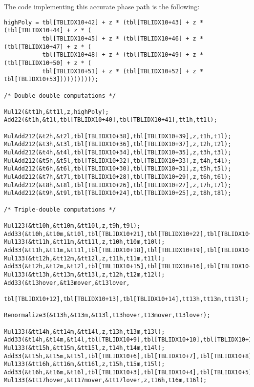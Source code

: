The code implementing this accurate phase path is the following:
\begin{lstlisting}[caption={High path accurate phase polynomial approximation},firstnumber=1]
highPoly = tbl[TBLIDX10+42] + z * (tbl[TBLIDX10+43] + z * (tbl[TBLIDX10+44] + z * (
           tbl[TBLIDX10+45] + z * (tbl[TBLIDX10+46] + z * (tbl[TBLIDX10+47] + z * (
           tbl[TBLIDX10+48] + z * (tbl[TBLIDX10+49] + z * (tbl[TBLIDX10+50] + z * (
           tbl[TBLIDX10+51] + z * (tbl[TBLIDX10+52] + z *  tbl[TBLIDX10+53]))))))))));

/* Double-double computations */

Mul12(&tt1h,&tt1l,z,highPoly);
Add22(&t1h,&t1l,tbl[TBLIDX10+40],tbl[TBLIDX10+41],tt1h,tt1l);

MulAdd212(&t2h,&t2l,tbl[TBLIDX10+38],tbl[TBLIDX10+39],z,t1h,t1l);
MulAdd212(&t3h,&t3l,tbl[TBLIDX10+36],tbl[TBLIDX10+37],z,t2h,t2l);
MulAdd212(&t4h,&t4l,tbl[TBLIDX10+34],tbl[TBLIDX10+35],z,t3h,t3l);
MulAdd212(&t5h,&t5l,tbl[TBLIDX10+32],tbl[TBLIDX10+33],z,t4h,t4l);
MulAdd212(&t6h,&t6l,tbl[TBLIDX10+30],tbl[TBLIDX10+31],z,t5h,t5l);
MulAdd212(&t7h,&t7l,tbl[TBLIDX10+28],tbl[TBLIDX10+29],z,t6h,t6l);
MulAdd212(&t8h,&t8l,tbl[TBLIDX10+26],tbl[TBLIDX10+27],z,t7h,t7l);
MulAdd212(&t9h,&t9l,tbl[TBLIDX10+24],tbl[TBLIDX10+25],z,t8h,t8l);

/* Triple-double computations */

Mul123(&tt10h,&tt10m,&tt10l,z,t9h,t9l);                                                        
Add33(&t10h,&t10m,&t10l,tbl[TBLIDX10+21],tbl[TBLIDX10+22],tbl[TBLIDX10+23],tt10h,tt10m,tt10l); 
Mul133(&tt11h,&tt11m,&tt11l,z,t10h,t10m,t10l);                                                 
Add33(&t11h,&t11m,&t11l,tbl[TBLIDX10+18],tbl[TBLIDX10+19],tbl[TBLIDX10+20],tt11h,tt11m,tt11l); 
Mul133(&tt12h,&tt12m,&tt12l,z,t11h,t11m,t11l);                                                 
Add33(&t12h,&t12m,&t12l,tbl[TBLIDX10+15],tbl[TBLIDX10+16],tbl[TBLIDX10+17],tt12h,tt12m,tt12l); 
Mul133(&tt13h,&tt13m,&tt13l,z,t12h,t12m,t12l);                                                 
Add33(&t13hover,&t13mover,&t13lover,
                        tbl[TBLIDX10+12],tbl[TBLIDX10+13],tbl[TBLIDX10+14],tt13h,tt13m,tt13l); 

Renormalize3(&t13h,&t13m,&t13l,t13hover,t13mover,t13lover);                                    

Mul133(&tt14h,&tt14m,&tt14l,z,t13h,t13m,t13l);                                                 
Add33(&t14h,&t14m,&t14l,tbl[TBLIDX10+9],tbl[TBLIDX10+10],tbl[TBLIDX10+11],tt14h,tt14m,tt14l);  
Mul133(&tt15h,&tt15m,&tt15l,z,t14h,t14m,t14l);                                                 
Add33(&t15h,&t15m,&t15l,tbl[TBLIDX10+6],tbl[TBLIDX10+7],tbl[TBLIDX10+8],tt15h,tt15m,tt15l);    
Mul133(&tt16h,&tt16m,&tt16l,z,t15h,t15m,t15l);                                                 
Add33(&t16h,&t16m,&t16l,tbl[TBLIDX10+3],tbl[TBLIDX10+4],tbl[TBLIDX10+5],tt16h,tt16m,tt16l);     
Mul133(&tt17hover,&tt17mover,&tt17lover,z,t16h,t16m,t16l);                                     


\end{lstlisting}
